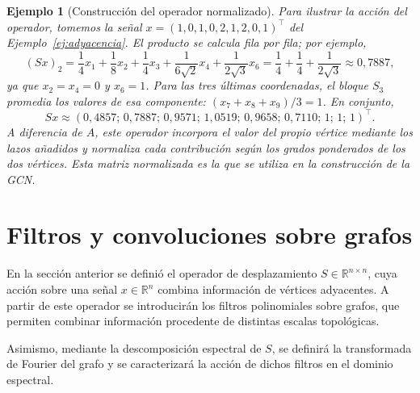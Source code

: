 \documentclass[a4paper,openany,oneside,10pt]{report}
\theoremstyle{pnlTeorema}
\theoremstyle{pnlDefinicion}
\theoremstyle{pnlObservacion}
\newtheorem{ejemplo}{Ejemplo}[section]
\begin{document}
\begin{ejemplo}[Construcción del operador normalizado]
Para ilustrar la acción del operador, tomemos la señal \(x=(1,0,1,0,2,1,2,0,1)^\top\) del Ejemplo~\ref{ej:adyacencia}. El producto se calcula fila por fila; por ejemplo,
\[
(Sx)_2=\frac14x_1+\frac18x_2+\frac14x_3+\frac1{6\sqrt2}x_4+\frac1{2\sqrt3}x_6
=\frac14+\frac14+\frac1{2\sqrt3}\approx 0{,}7887,
\]
ya que \(x_2=x_4=0\) y \(x_6=1\). Para las tres últimas coordenadas, el bloque \(S_3\) promedia los valores de esa componente: \((x_7+x_8+x_9)/3=1\). En conjunto,
\[
Sx\approx(0{,}4857;\,0{,}7887;\,0{,}9571;\,1{,}0519;\,0{,}9658;\,0{,}7110;\,1;\,1;\,1)^\top.
\]
A diferencia de \(A\), este operador incorpora el valor del propio vértice mediante los lazos añadidos y normaliza cada contribución según los grados ponderados de los dos vértices. Esta matriz normalizada es la que se utiliza en la construcción de la GCN.
\end{ejemplo}


\section{Filtros y convoluciones sobre grafos}\label{sec:filtros}

En la sección anterior se definió el operador de desplazamiento \(S\in\mathbb R^{n\times n}\), cuya acción sobre una señal \(x\in\mathbb R^n\) combina información de vértices adyacentes. A partir de este operador se introducirán los filtros polinomiales sobre grafos, que permiten combinar información procedente de distintas escalas topológicas.

Asimismo, mediante la descomposición espectral de \(S\), se definirá la transformada de Fourier del grafo y se caracterizará la acción de dichos filtros en el dominio espectral.
\end{document}
